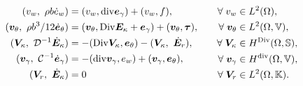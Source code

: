 \begin{equation}
\label{eq:weak_min_PH_weak}
\begin{aligned}
(v_w, \ \rho b \dot{e}_w) &= (v_w, \mathrm{div} \bm{e}_\gamma) + (v_w, f), \\ 
(\bm{v}_\theta, \ \rho b^3/12  \dot{\bm{e}}_\theta) &= (\bm{v}_\theta, \mathrm{Div} \bm{E}_\kappa + \bm{e}_\gamma) + (\bm{v}_\theta, \bm{\tau}), \\  
(\bm{V}_\kappa, \ \mathcal{D}^{-1} \dot{\bm{E}}_\kappa) &= -(\mathrm{Div} \bm{V}_\kappa,  \bm{e}_\theta) - (\bm{V}_\kappa, \ \dot{\bm{E}}_r), \\ 
(\bm{v}_\gamma, \ \mathcal{C}^{-1} \dot{\bm{e}}_\gamma) &= -(\mathrm{div} \bm{v}_\gamma, e_w ) + (\bm{v}_\gamma, \bm{e}_{\theta}), \\ 
(\bm{V}_r, \ \dot{\bm{E}}_\kappa) &= 0
\end{aligned} \qquad
\begin{aligned}
\forall \;v_w &\in L^2(\Omega), \\
\forall \; \bm{v}_\theta &\in L^2(\Omega, \mathbb{V}), \\
\forall \;\bm{V}_\kappa &\in H^{\Div}(\Omega, \mathbb{S}), \\
\forall \;\bm{v}_\gamma &\in H^{\div}(\Omega, \mathbb{V}), \\
\forall \;\bm{V}_r &\in L^2(\Omega, \mathbb{K}).\\
\end{aligned}
\end{equation}

